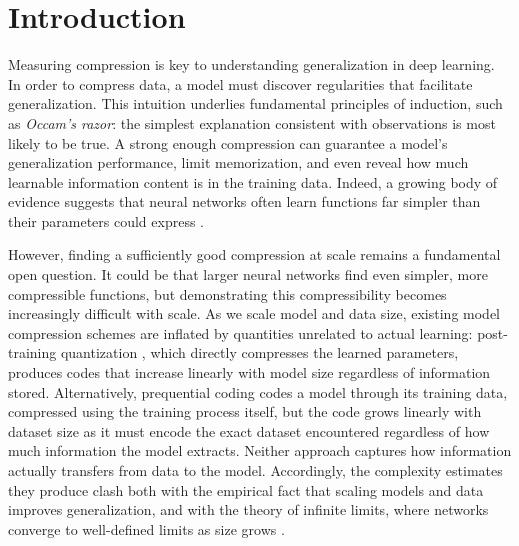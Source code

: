 \documentclass{article}
\theoremstyle{plain}
\theoremstyle{definition}
\theoremstyle{remark}
\begin{document}
%
\section{Introduction}

Measuring compression is key to understanding generalization in deep learning.
In order to compress data, a model must discover regularities that facilitate generalization. This intuition underlies fundamental principles of induction, such as \emph{Occam's razor}: the simplest explanation consistent with observations is most likely to be true. A strong enough compression can guarantee a model's generalization performance, limit memorization, and even reveal how much learnable information content is in the training data. Indeed, a growing body of evidence suggests that neural networks often learn functions far simpler than their parameters could express \citep{li2018measuring, frankle2018lottery, zhou2018non, lotfi2022pac, wilson2025deep}.

However, finding a sufficiently good compression at scale remains a fundamental open question. It could be that larger neural networks find even simpler, more compressible functions, but demonstrating this compressibility becomes increasingly difficult with scale. As we scale model and data size, existing model compression schemes are inflated by quantities unrelated to actual learning: post-training quantization \citep{frantar2023gptq, tseng2024quip}, which directly compresses the learned parameters, produces codes that increase linearly with model size regardless of information stored. Alternatively, prequential coding \citep{dawid1984present, blier2018description} codes a model through its training data, compressed using the training process itself, but the code grows linearly with dataset size as it must encode the exact dataset encountered regardless of how much information the model extracts. Neither approach captures how information actually transfers from data to the model. Accordingly, the complexity estimates they produce clash both with the empirical fact that scaling models and data improves generalization, and with the theory of infinite limits, where networks converge to well-defined limits as size grows \citep{yang2022tensor,yang2023feature,dey2026don}.
\end{document}
